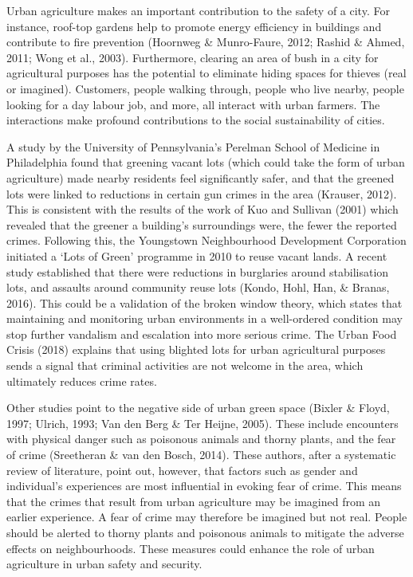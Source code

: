 Urban agriculture makes an important contribution to the safety of a city. For instance, roof-top gardens help to promote energy efficiency in buildings and contribute to fire prevention (Hoornweg \& Munro-Faure, 2012; Rashid \& Ahmed, 2011; Wong et al., 2003). Furthermore, clearing an area of bush in a city for agricultural purposes has the potential to eliminate hiding spaces for thieves (real or imagined). Customers, people walking through, people who live nearby, people looking for a day labour job, and more, all interact with urban farmers. The interactions make profound contributions to the social sustainability of cities.

A study by the University of Pennsylvania's Perelman School of Medicine in Philadelphia found that greening vacant lots (which could take the form of urban agriculture) made nearby residents feel significantly safer, and that the greened lots were linked to reductions in certain gun crimes in the area (Krauser, 2012). This is consistent with the results of the work of Kuo and Sullivan (2001) which revealed that the greener a building's surroundings were, the fewer the reported crimes. Following this, the Youngstown Neighbourhood Development Corporation initiated a ‘Lots of Green’ programme in 2010 to reuse vacant lands. A recent study established that there were reductions in burglaries around stabilisation lots, and assaults around community reuse lots (Kondo, Hohl, Han, \& Branas, 2016). This could be a validation of the broken window theory, which states that maintaining and monitoring urban environments in a well-ordered condition may stop further vandalism and escalation into more serious crime. The Urban Food Crisis (2018) explains that using blighted lots for urban agricultural purposes sends a signal that criminal activities are not welcome in the area, which ultimately reduces crime rates.

Other studies point to the negative side of urban green space (Bixler \& Floyd, 1997; Ulrich, 1993; Van den Berg \& Ter Heijne, 2005). These include encounters with physical danger such as poisonous animals and thorny plants, and the fear of crime (Sreetheran \& van den Bosch, 2014). These authors, after a systematic review of literature, point out, however, that factors such as gender and individual's experiences are most influential in evoking fear of crime. This means that the crimes that result from urban agriculture may be imagined from an earlier experience. A fear of crime may therefore be imagined but not real. People should be alerted to thorny plants and poisonous animals to mitigate the adverse effects on neighbourhoods. These measures could enhance the role of urban agriculture in urban safety and security.

